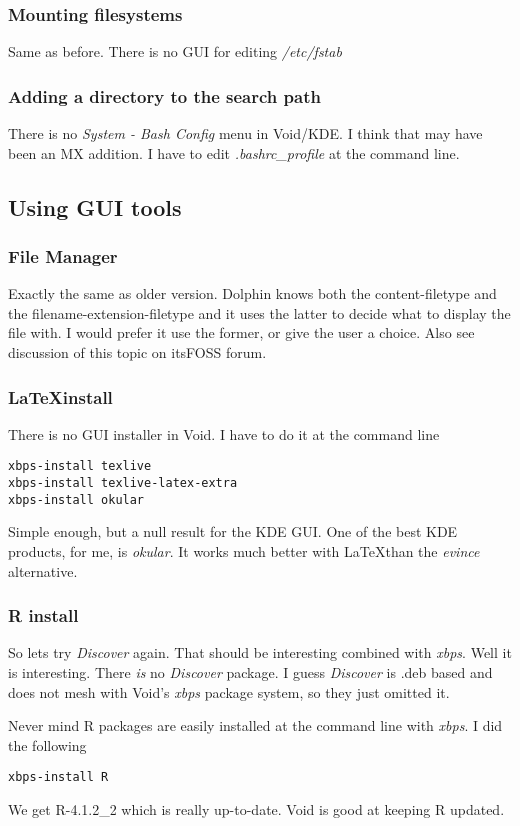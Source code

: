 \documentclass{article}  %
\begin{document}
\subsubsection{Mounting filesystems}
Same as before. There is no GUI for editing {\em /etc/fstab}

\subsubsection{Adding a directory to the search path}
There is no {\em System - Bash Config} menu in Void/KDE. I think that may have been an MX addition. I have to edit {\em .bashrc\_profile} at the command line.


\subsection{Using GUI tools }
\subsubsection{File Manager}
Exactly the same as older version. Dolphin knows both the content-filetype and the filename-extension-filetype and it uses the latter to decide what to display the file with. I would prefer it use the former, or give the user a choice. 
Also see discussion of this topic on itsFOSS forum.

\subsubsection{\LaTeX install}
 There is no GUI installer in Void. I have to do it at the command line
\begin{verbatim}
xbps-install texlive
xbps-install texlive-latex-extra
xbps-install okular
\end{verbatim}
Simple enough, but a null result for the KDE GUI.
One of the best KDE products,  for me, is {\em okular}. It works much better with \LaTeX than the {\em evince} alternative.

\subsubsection{R install}
So lets try {\em Discover} again. That should be interesting combined with {\em xbps}.
Well it is interesting. There {\em is} no {\em Discover} package. I guess {\em Discover} is .deb based and does not mesh with Void's {\em xbps} package system, so they just omitted it.

Never mind R packages are easily installed at the command line with {\em xbps}. I did the following
\begin{verbatim}
xbps-install R
\end{verbatim}
We get R-4.1.2\_2 which is really up-to-date. Void is good at keeping R updated. 
\end{document}

